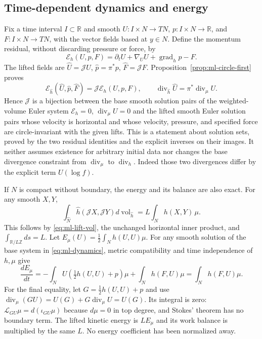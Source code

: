 \subsection{Time-dependent dynamics and energy}
Fix a time interval $I\subset\mathbb R$ and smooth
$U:I\times N\to TN$, $p:I\times N\to\mathbb R$, and
$F:I\times N\to TN$, with the vector fields based at $y\in N$.
Define the momentum residual, without discarding pressure or force, by
\begin{equation}\label{eq:ml-Euler-residual}
 \mathcal E_{h}(U,p,F)
    =\partial_tU+\nabla_UU+\operatorname{grad}_hp-F.
\end{equation}
The lifted fields are
$\widehat U=\mathcal JU$, $\widehat p=\pi^*p$,
$\widehat F=\mathcal JF$. Proposition~\ref{prop:ml-circle-first} proves
\begin{equation}\label{eq:ml-dynamics}
 \mathcal E_{\widehat h}(\widehat U,\widehat p,\widehat F)
   =\mathcal J\mathcal E_h(U,p,F),\qquad
 \operatorname{div}_{\widehat h}\widehat U
   =\pi^*\operatorname{div}_\mu U.
\end{equation}
Hence $\mathcal J$ is a bijection between the base smooth solution pairs
of the weighted-volume Euler system
$\mathcal E_h=0$, $\operatorname{div}_\mu U=0$ and the lifted smooth
Euler solution pairs whose velocity is horizontal and whose velocity,
pressure, and specified force are circle-invariant with the given lifts.
This is a statement about solution sets, proved by the two residual
identities and the explicit inverses on their images. It neither assumes
existence for arbitrary initial data nor changes the base divergence
constraint from $\operatorname{div}_\mu$ to $\operatorname{div}_h$.
Indeed those two divergences differ by the explicit term $U(\log f)$.

If $N$ is compact without boundary, the energy and its balance are
also exact. For any smooth $X,Y$,
\begin{equation}\label{eq:ml-energy-norm}
 \int_{\widehat N}\widehat h(\mathcal JX,\mathcal JY)
              d\operatorname{vol}_{\widehat h}
   =L\int_N h(X,Y)\,\mu.
\end{equation}
This follows by \eqref{eq:ml-lift-vol}, the unchanged horizontal inner
product, and $\int_{\mathbb R/L\mathbb Z}ds=L$.
Let $E_\mu(U)=\tfrac12\int_Nh(U,U)\mu$.
For any smooth solution of the base system in \eqref{eq:ml-dynamics},
metric compatibility and time independence of $h,\mu$ give
\[
 \frac{dE_\mu}{dt}
  =-\int_N U\!\left(\tfrac12h(U,U)+p\right)\mu
      +\int_Nh(F,U)\mu
  =\int_Nh(F,U)\mu.
\]
For the final equality, let $G=\tfrac12h(U,U)+p$ and use
$\operatorname{div}_\mu(GU)=U(G)+G\operatorname{div}_\mu U=U(G)$.
Its integral is zero: $\mathcal L_{GU}\mu=d(\iota_{GU}\mu)$ because
$d\mu=0$ in top degree, and Stokes' theorem has no boundary term.
The lifted kinetic energy is $LE_\mu$ and its work balance is multiplied
by the same $L$. No energy coefficient has been normalized away.

